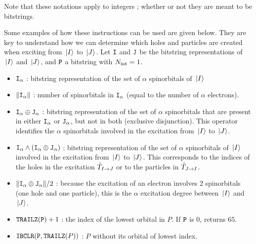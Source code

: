 \documentclass[./thesis.tex]{subfiles}
\begin{document}
Note that these notations apply to integers ; whether or not they are meant to be bitstrings.

Some examples of how these instructions can be used are given below. They are key to understand how we can determine which holes and particles are created when exciting from ${\ket*{I}}$ to ${\ket*{J}}$.
Let ${\texttt{I}}$ and ${{\texttt{J}}}$ be the bitstring representations of ${\ket*{I}}$ and ${\ket*{J}}$, and ${\texttt{P}}$ a bitstring with ${N_\text{int}}=1$. 


\begin{itemize}
	      
	\item ${\texttt{I}_{\alpha}}$ : bitstring representation of the set of $\alpha$ spinorbitals of ${\ket*{I}}$
	            
	\item $\norm{{\texttt{I}_{\alpha}}}$ : number of spinorbitals in ${\texttt{I}_{\alpha}}$ (equal to the number of $\alpha$ electrons).
	            
	\item ${\texttt{I}_{\alpha}} \oplus {\texttt{J}_{\alpha}}$ : bitstring representation of the set of $\alpha$ spinorbitals that are present in either ${\texttt{I}_{\alpha}}$ or ${\texttt{J}_{\alpha}}$, but not in both (exclusive disjunction).
        This operator identifies the $\alpha$ spinorbitals involved in the excitation from ${\ket*{I}}$ to ${\ket*{J}}$. 
	            
	\item ${\texttt{I}_{\alpha}} \wedge \qty({\texttt{I}_{\alpha}} \oplus {\texttt{J}_{\alpha}})$ : 
        bitstring representation of the set of $\alpha$ spinorbitals of ${\ket*{I}}$ involved in the excitation from ${\ket*{I}}$ to ${\ket*{J}}$. This corresponds to the indices of the holes in the excitation ${\hat{T}_{I \rightarrow J}}$ or to the particles in ${\hat{T}_{J \rightarrow I}}$. 
	            
	\item $\norm{{\texttt{I}_{\alpha}} \oplus {\texttt{J}_{\alpha}}}/2$ : because the excitation of an electron involves 2 spinorbitals (one hole and one particle), this is the $\alpha$ excitation degree between ${\ket*{I}}$ and ${\ket*{J}}$.
	            
	\item $\text{\texttt{TRAILZ}}({\texttt{P}})+1$ : the index of the lowest orbital in $P$. If ${\texttt{P}}$ is $0$, returns $65$.
	            
	\item $\text{\texttt{IBCLR}}({\texttt{P}},\text{\texttt{TRAILZ}}(P))$ : $P$ without its orbital of lowest index.

\end{itemize}
\end{document}
